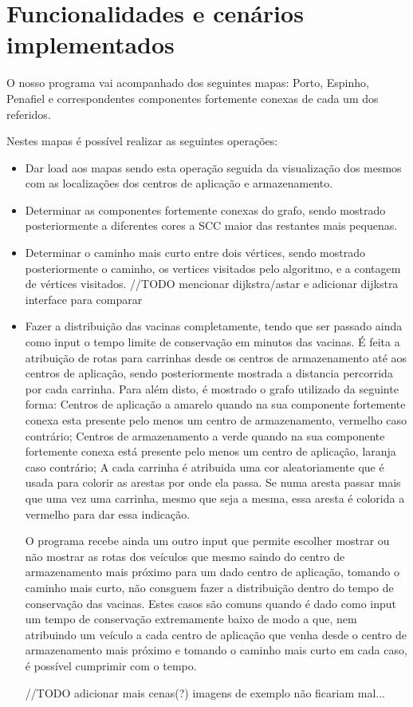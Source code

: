\documentclass[12pt,a4paper]{report}
\begin{document}
\chapter{Funcionalidades e cenários implementados}
O nosso programa vai acompanhado dos seguintes mapas: Porto, Espinho, Penafiel e correspondentes componentes
fortemente conexas de cada um dos referidos. \par

Nestes mapas é possível realizar as seguintes operações:
\begin{itemize}
	\item Dar load aos mapas sendo esta operação seguida da visualização dos mesmos com as localizações dos centros
		de aplicação e armazenamento.
	\item Determinar as componentes fortemente conexas do grafo, sendo mostrado posteriormente a diferentes cores
		a SCC maior das restantes mais pequenas.
	\item Determinar o caminho mais curto entre dois vértices, sendo mostrado posteriormente o caminho, os vertices visitados
		pelo algoritmo, e a contagem de vértices visitados.
		//TODO mencionar dijkstra/astar e adicionar dijkstra interface para comparar
	\item Fazer a distribuição das vacinas completamente, tendo que ser passado ainda como input o tempo limite de conservação em minutos das vacinas.
		É feita a atribuição de rotas para carrinhas desde os centros de armazenamento até aos centros de aplicação,
		sendo posteriormente mostrada a distancia percorrida por cada carrinha. Para além disto, é mostrado o grafo utilizado
		da seguinte forma: Centros de aplicação a amarelo quando na sua componente fortemente conexa esta presente pelo menos um centro de armazenamento, vermelho caso contrário;
		Centros de armazenamento a verde quando na sua componente fortemente conexa está presente pelo menos um centro de aplicação, laranja caso contrário;
		A cada carrinha é atribuida uma cor aleatoriamente que é usada para colorir as arestas por onde ela passa. Se numa aresta passar mais que uma vez uma carrinha, mesmo que seja a mesma,
		essa aresta é colorida a vermelho para dar essa indicação. \par
		O programa recebe ainda um outro input que permite escolher mostrar ou não mostrar as rotas dos veículos que mesmo saindo do centro
		de armazenamento mais próximo para um dado centro de aplicação, tomando o caminho mais curto, não consguem fazer a distribuição dentro do tempo de conservação das vacinas.
		Estes casos são comuns quando é dado como input um tempo de conservação extremamente baixo de modo a que, nem atribuindo um veículo a cada centro de aplicação
		que venha desde o centro de armazenamento mais próximo e tomando o caminho mais curto em cada caso, é possível cumprimir com o tempo.

		//TODO adicionar mais cenas(?) imagens de exemplo não ficariam mal...

\end{itemize}
\end{document}
